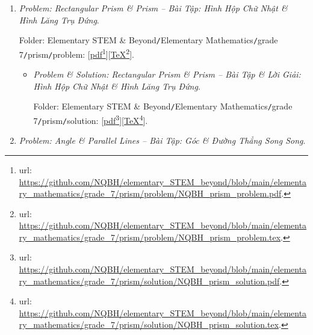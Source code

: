 \documentclass[12pt]{article}
\begin{document}
\begin{enumerate}
\begin{itemize}
		Folder: {\sf Elementary STEM \& Beyond{\tt/}Elementary Mathematics{\tt/}grade 7{\tt/}real{\tt/}solution}: [\href{https://github.com/NQBH/elementary_STEM_beyond/blob/main/elementary_mathematics/grade_7/real/problem/NQBH_real_solution.pdf}{pdf}\footnote{{\sc url}: \url{https://github.com/NQBH/elementary_STEM_beyond/blob/main/elementary_mathematics/grade_7/real/problem/NQBH_real_solution.pdf}.}][\href{https://github.com/NQBH/elementary_STEM_beyond/blob/main/elementary_mathematics/grade_7/real/problem/NQBH_real_solution.tex}{\TeX}\footnote{{\sc url}: \url{https://github.com/NQBH/elementary_STEM_beyond/blob/main/elementary_mathematics/grade_7/real/problem/NQBH_real_solution.tex}.}].
	\end{itemize}
	\item {\it Problem: Rectangular Prism \& Prism -- Bài Tập: Hình Hộp Chữ Nhật \& Hình Lăng Trụ Đứng}.
	
	Folder: {\sf Elementary STEM \& Beyond{\tt/}Elementary Mathematics{\tt/}grade 7{\tt/}prism{\tt/}problem}: [\href{https://github.com/NQBH/elementary_STEM_beyond/blob/main/elementary_mathematics/grade_7/prism/problem/NQBH_prism_problem.pdf}{pdf}\footnote{{\sc url}: \url{https://github.com/NQBH/elementary_STEM_beyond/blob/main/elementary_mathematics/grade_7/prism/problem/NQBH_prism_problem.pdf}.}][\href{https://github.com/NQBH/elementary_STEM_beyond/blob/main/elementary_mathematics/grade_7/prism/problem/NQBH_prism_problem.tex}{\TeX}\footnote{{\sc url}: \url{https://github.com/NQBH/elementary_STEM_beyond/blob/main/elementary_mathematics/grade_7/prism/problem/NQBH_prism_problem.tex}.}].
	\begin{itemize}
		\item {\it Problem \& Solution: Rectangular Prism \& Prism -- Bài Tập \& Lời Giải: Hình Hộp Chữ Nhật \& Hình Lăng Trụ Đứng}.
		
		Folder: {\sf Elementary STEM \& Beyond{\tt/}Elementary Mathematics{\tt/}grade 7{\tt/}prism{\tt/}solution}: [\href{https://github.com/NQBH/elementary_STEM_beyond/blob/main/elementary_mathematics/grade_7/prism/solution/NQBH_prism_solution.pdf}{pdf}\footnote{{\sc url}: \url{https://github.com/NQBH/elementary_STEM_beyond/blob/main/elementary_mathematics/grade_7/prism/solution/NQBH_prism_solution.pdf}.}][\href{https://github.com/NQBH/elementary_STEM_beyond/blob/main/elementary_mathematics/grade_7/prism/solution/NQBH_prism_solution.tex}{\TeX}\footnote{{\sc url}: \url{https://github.com/NQBH/elementary_STEM_beyond/blob/main/elementary_mathematics/grade_7/prism/solution/NQBH_prism_solution.tex}.}].
	\end{itemize}
	\item {\it Problem: Angle \& Parallel Lines -- Bài Tập: Góc \& Đường Thẳng Song Song}.
	

\end{enumerate}
\end{document}
